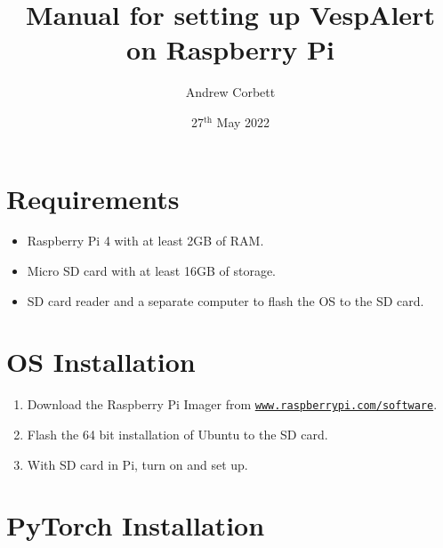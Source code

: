 \documentclass[12pt, a4paper, oneside]{article}
\title{Manual for setting up VespAlert on Raspberry Pi}
\author{Andrew Corbett}
\date{27$^{\mathrm{th}}$ May 2022}
\begin{document}
\maketitle

\section{Requirements}

\begin{itemize}
\item
Raspberry Pi 4 with at least 2GB of RAM.

\item
Micro SD card with at least 16GB of storage.

\item
SD card reader and a separate computer to flash the OS to the SD card.
\end{itemize}


\section{OS Installation}

\begin{enumerate}

\item
Download the Raspberry Pi Imager from \href{https://www.raspberrypi.com/software/}{\texttt{www.raspberrypi.com/software}}.

\item
Flash the 64 bit installation of Ubuntu to the SD card.

\item
With SD card in Pi, turn on and set up.

\end{enumerate}


\section{PyTorch Installation}
\end{document}
